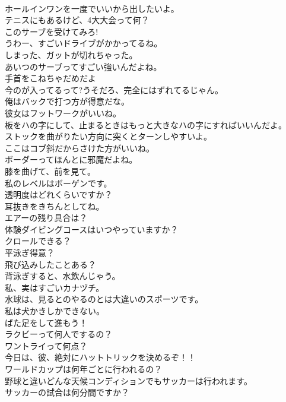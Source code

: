\documentclass[8pt]{extreport}
\begin{document}
\begin{CJK}{UTF8}{min}
\\	ホールインワンを一度でいいから出したいよ。	
\\	テニスにもあるけど、4大大会って何？	
\\	このサーブを受けてみろ!	
\\	うわー、すごいドライブがかかってるね。	
\\	しまった、ガットが切れちゃった。	
\\	あいつのサーブってすごい強いんだよね。	
\\	手首をこねちゃだめだよ	
\\	今のが入ってるって?うそだろ、完全にはずれてるじゃん。	
\\	俺はバックで打つ方が得意だな。	
\\	彼女はフットワークがいいね。	
\\	板をハの字にして、止まるときはもっと大きなハの字にすればいいんだよ。	
\\	ストックを曲がりたい方向に突くとターンしやすいよ。	
\\	ここはコブ斜だからさけた方がいいね。	
\\	ボーダーってほんとに邪魔だよね。	
\\	膝を曲げて、前を見て。	
\\	私のレベルはボーゲンです。	
\\	透明度はどれくらいですか？	
\\	耳抜きをきちんとしてね。	
\\	エアーの残り具合は？	
\\	体験ダイビングコースはいつやっていますか？	
\\	クロールできる？	
\\	平泳ぎ得意？	
\\	飛び込みしたことある？	
\\	背泳ぎすると、水飲んじゃう。	
\\	私、実はすごいカナヅチ。	
\\	水球は、見るとのやるのとは大違いのスポーツです。	
\\	私は犬かきしかできない。	
\\	ばた足をして進もう！	
\\	ラクビーって何人でするの？	
\\	ワントライって何点？	
\\	今日は、彼、絶対にハットトリックを決めるぞ！！	
\\	ワールドカップは何年ごとに行われるの？	
\\	野球と違いどんな天候コンディションでもサッカーは行われます。	
\\	サッカーの試合は何分間ですか？	

\end{CJK}
\end{document}
